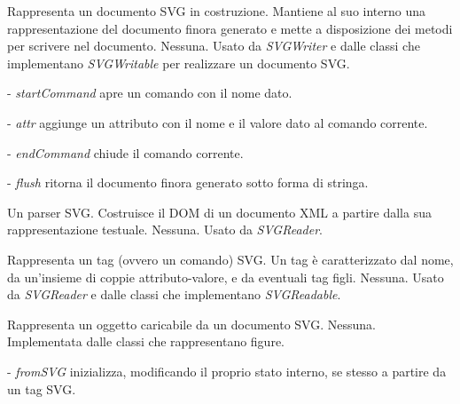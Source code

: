 Rappresenta un documento SVG in costruzione. Mantiene al suo interno una rappresentazione del documento finora generato e mette a disposizione dei metodi per scrivere nel documento.
Nessuna.
Usato da \textit{SVGWriter} e dalle classi che implementano \textit{SVGWritable} per realizzare un documento SVG.
\begin{elencopuntato}[\normindent]
\item[-] \textit{startCommand} apre un comando con il nome dato.
\item[-] \textit{attr} aggiunge un attributo con il nome e il valore dato al comando corrente.
\item[-] \textit{endCommand} chiude il comando corrente.
\item[-] \textit{flush} ritorna il documento finora generato sotto forma di stringa.
\end{elencopuntato}

Un parser SVG. Costruisce il DOM di un documento XML a partire dalla sua rappresentazione testuale.
Nessuna.
Usato da \textit{SVGReader}.

Rappresenta un tag (ovvero un comando) SVG. Un tag \`e caratterizzato dal nome, da un'insieme di coppie attributo-valore, e da eventuali tag figli.
Nessuna.
Usato da \textit{SVGReader} e dalle classi che implementano \textit{SVGReadable}.

Rappresenta un oggetto caricabile da un documento SVG.
Nessuna.
Implementata dalle classi che rappresentano figure.
\begin{elencopuntato}[\normindent]
\item[-] \textit{fromSVG} inizializza, modificando il proprio stato interno, se stesso a partire da un tag SVG.
\end{elencopuntato}

